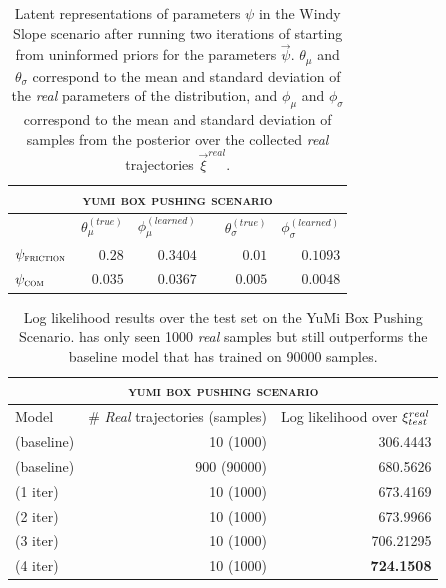 \begin{table}
\centering
\begin{tabular}{lrrcrr}
\multicolumn{6}{c}{\textsc{yumi box pushing scenario}} \\
\toprule
& $\theta_\mu^{(true)}$ & $\phi_\mu^{(learned)}$ && $\theta_\sigma^{(true)}$ & $\phi_\sigma^{(learned)}$ \\
\midrule
$\psi_{\textsc{friction}}$ & $0.28$ & $0.3404$ && $0.01$ & $0.1093$ \\
$\psi_{\textsc{com}}$ & $0.035$ & $ 0.0367$ && $0.005$ & $0.0048$ \\
\bottomrule
\end{tabular}
\caption{Latent representations of parameters $\psi$ in the Windy Slope scenario after running two iterations of \dettostoc{} starting from uninformed priors for the parameters $\vec{\psi}$. $\theta_\mu$ and $\theta_\sigma$ correspond to the mean and standard deviation of the \emph{real} parameters of the distribution, and $\phi_\mu$ and $\phi_\sigma$ correspond to the mean and standard deviation of samples from the posterior over the collected \emph{real} trajectories $\vec{\xi}^{real}$. }
\label{table:yumi_parameters}
\end{table}


\begin{table}
\centering
\begin{tabular}{lrr}
\multicolumn{3}{c}{\textsc{yumi box pushing scenario}} \\
\toprule
Model & \# \emph{Real} trajectories (samples) & Log likelihood over $\xi^{real}_{test}$ \\
\midrule
\cvae{} (baseline) & 10 (1000) & 306.4443\\
\cvae{} (baseline) & 900 (90000) & 680.5626 \\
\dettostoc{} (1 iter) & 10 (1000) & 673.4169\\
\dettostoc{} (2 iter) & 10 (1000) & 673.9966\\
\dettostoc{} (3 iter) & 10 (1000) & 706.21295\\
\dettostoc{} (4 iter) & 10 (1000) & \textbf{724.1508}\\

\bottomrule
\end{tabular}
\caption{Log likelihood results over the test set on the YuMi Box Pushing Scenario. \dettostoc{} has only seen 1000 \emph{real} samples but still outperforms the baseline model that has trained on 90000 samples.}
\label{fig:windyslope_logprob}
\end{table}


